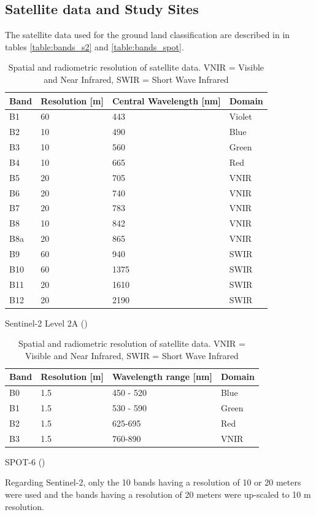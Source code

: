 \documentclass[10pt]{article}
\begin{document}
\subsection{Satellite data and Study Sites}
The satellite data used for the ground land classification are described in in tables \ref{table:bands_s2} and \ref{table:bands_spot}.
\begin{table}[H]
    \centering
    \begin{subtable}{.52\textwidth}
        \centering
        \begin{tabular}{@{}lp{2cm}p{2.2cm}l@{}}\toprule
            Band & Resolution [m] & Central Wavelength [nm] & Domain \\\hline
            B1 & 60 & 443 & Violet \\
            B2 & 10 & 490 & Blue \\
            B3 & 10 & 560 & Green \\
            B4 & 10 & 665 & Red \\
            B5 & 20 & 705 & VNIR \\
            B6 & 20 & 740 & VNIR \\
            B7 & 20 & 783 & VNIR \\
            B8 & 10 & 842 & VNIR \\
            B8a & 20 & 865 & VNIR \\
            B9 & 60 & 940 & SWIR \\
            B10 & 60 & 1375 & SWIR \\
            B11 & 20 & 1610 & SWIR \\
            B12 & 20 & 2190 & SWIR\\\bottomrule
        \end{tabular}
        \caption{Sentinel-2 Level 2A (\cite{esa-s2res,theia})}
        \label{table:bands_s2}
    \end{subtable}
    \begin{subtable}{.45\textwidth}
        \centering
        \begin{tabular}{@{}lp{1.8cm}p{2cm}l@{}}\toprule
            Band & Resolution [m] & Wavelength range [nm] & Domain \\\hline
            B0 & 1.5 & 450 - 520 & Blue \\
            B1 & 1.5 & 530 - 590 & Green \\
            B2 & 1.5 & 625-695 & Red \\
            B3 & 1.5 & 760-890 & VNIR \\\bottomrule
        \end{tabular}
        \caption{SPOT-6 (\cite{SPOT6_technical-sheet})}
        \label{table:bands_spot}
    \end{subtable}
    \caption{Spatial and radiometric resolution of satellite data. VNIR = Visible and Near Infrared, SWIR = Short Wave Infrared}
    \label{table:bands}
\end{table}
Regarding Sentinel-2, only the 10 bands having a resolution of 10 or 20 meters were used and the bands having a resolution of 20 meters were up-scaled to 10 m resolution.\\
\end{document}
